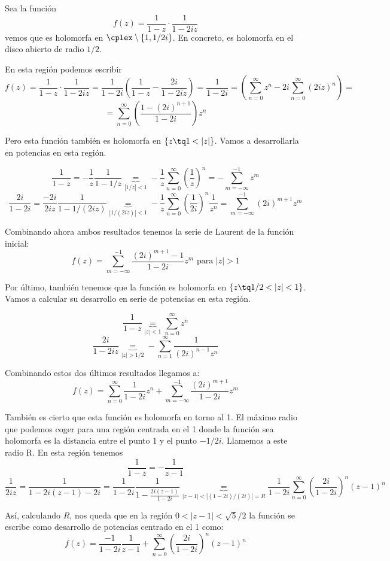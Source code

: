 \documentclass{apuntes}
\begin{document}
\begin{example}
Sea la función
\[f(z)=\frac{1}{1-z}\cdot \frac{1}{1-2iz}\]
vemos que es holomorfa en $\cplex\setminus\{1,1/2i\}$. En concreto, es holomorfa en el disco abierto de radio $1/2$.

En esta región podemos escribir
\[f(z)=\frac{1}{1-z}\cdot \frac{1}{1-2iz} = \frac{1}{1-2i}\left(\frac{1}{1-z}-\frac{2i}{1-2iz} \right)=\frac{1}{1-2i}=\left(\sum_{n=0}^{\infty} z^n - 2i\sum_{n=0}^{\infty}(2iz)^n \right)=\]
\[=\sum_{n=0}^{\infty}\left(\frac{1-(2i)^{n+1}}{1-2i}\right)z^n\]

Pero esta función también es holomorfa en $\{z \tq 1<|z|\}$. Vamos a desarrollarla en potencias en esta región.

\[\frac{1}{1-z} = -\frac{1}{z}\frac{1}{1-1/z}\underbrace{=}_{|1/z|<1} -\frac{1}{z}\sum_{n=0}^{\infty}\left(\frac{1}{z}\right)^n = -\sum_{m=-\infty}^{-1}z^m\]
\[\frac{2i}{1-2i}= \frac{-2i}{2iz}\frac{1}{1-1/(2iz)} \underbrace{=}_{|1/(2iz)|<1} -\frac{1}{z}\sum_{n=0}^{\infty}\left(\frac{1}{2i}\right)^n\frac{1}{z^n}=\sum_{m=-\infty}^{-1}(2i)^{m+1}z^m\]

Combinando ahora ambos resultados tenemos la serie de Laurent de la función inicial:
\[f(z)=\sum_{m=-\infty}^{-1}\frac{(2i)^{m+1}-1}{1-2i}z^m \text{ para } |z| >1\]

Por último, también tenemos que la función es holomorfa en $\{z \tq 1/2<|z|<1\}$. Vamos a calcular su desarrollo en serie de potencias en esta región.

\[\frac{1}{1-z} \underbrace{=}_{|z|<1} \sum_{n=0}^{\infty} z^n\]
\[\frac{2i}{1-2iz} \underbrace{=}_{|z|>1/2} - \sum_{n=1}^{\infty}\frac{1}{(2i)^{n-1}z^n}\]

Combinando estos dos últimos resultados llegamos a:
\[f(z)=\sum_{n=0}^{\infty}\frac{1}{1-2i}z^n+\sum_{m=-\infty}^{-1}\frac{(2i)^{m+1}}{1-2i}z^m\]

También es cierto que esta función es holomorfa en torno al 1. El máximo radio que podemos coger para una región centrada en el 1 donde la función sea holomorfa es la distancia entre el punto 1 y el punto $-1/2i$. Llamemos a este radio R. En esta región tenemos
\[\frac{1}{1-z} = -\frac{1}{z-1}\]
\[\frac{1}{2iz} = \frac{1}{1-2i(z-1)-2i} = \frac{1}{1-2i}\frac{1}{1-\frac{2i(z-1)}{1-2i}} \underbrace{=}_{|z-1|<|(1-2i)/(2i)|=R} \frac{1}{1-2i}\sum_{n=0}^{\infty} \left( \frac{2i}{1-2i}\right)^n (z-1)^n\]

Así, calculando $R$, nos queda que en la región $0<|z-1|<\sqrt{5}/2$ la función se escribe como desarrollo de potencias centrado en el 1 como:
\[f(z)=\frac{-1}{1-2i}\frac{1}{z-1}+\sum_{n=0}^{\infty}\left(\frac{2i}{1-2i} \right)^n(z-1)^n\]
\end{example}
\end{document}
